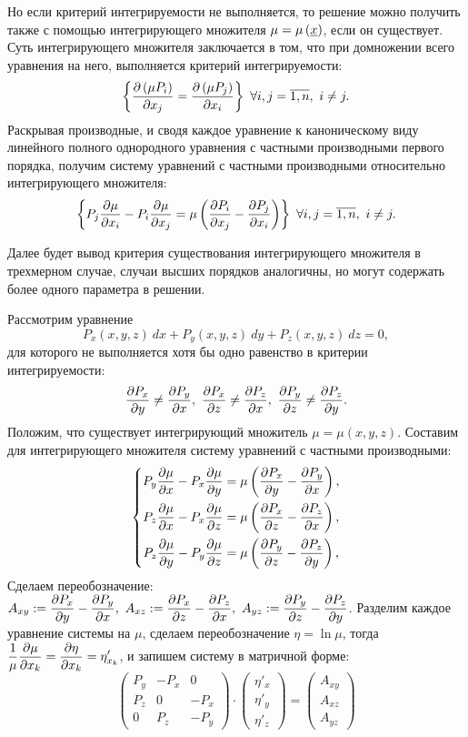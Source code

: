 	\vspace{10pt}
	Но если критерий интегрируемости не выполняется, то решение можно получить также с помощью интегрирующего множителя $\mu = \mu\left( \underline{x} \right)$, если он существует. Суть интегрирующего множителя заключается в том, что при домножении всего уравнения на него, выполняется критерий интегрируемости:
	\[ \left\lbrace  \dfrac{\partial \left( \mu P_i \right)}{\partial x_j} = \dfrac{\partial \left( \mu P_j \right)}{\partial x_i}  \right\rbrace ~ \forall i, j = \overline{1, n}, ~ i \neq j. \]
	Раскрывая производные, и сводя каждое уравнение к каноническому виду линейного полного однородного уравнения с частными производными первого порядка, получим систему уравнений с частными производными относительно интегрирующего множителя:
	\[ \left\lbrace  P_j \dfrac{\partial \mu}{\partial x_i} - P_i \dfrac{\partial \mu}{\partial x_j} = \mu \left( \dfrac{\partial P_i}{\partial x_j} - \dfrac{\partial P_j}{\partial x_i} \right)  \right\rbrace ~ \forall i, j = \overline{1, n}, ~ i \neq j. \]

	\vspace{10pt}
	Далее будет вывод критерия существования интегрирующего множителя в трехмерном случае, случаи высших порядков аналогичны, но могут содержать более одного параметра в решении.

	Рассмотрим уравнение
	\[ P_x (x, y, z) ~ dx + P_y (x, y, z) ~ dy + P_z (x, y, z) ~ dz = 0, \]
	для которого не выполняется хотя бы одно равенство в критерии интегрируемости:
	\[ \dfrac{\partial P_x}{\partial y} \neq \dfrac{\partial P_y}{\partial x}, ~ \dfrac{\partial P_x}{\partial z} \neq \dfrac{\partial P_z}{\partial x}, ~ \dfrac{\partial P_y}{\partial z} \neq \dfrac{\partial P_z}{\partial y}. \]
	Положим, что существует интегрирующий множитель $\mu = \mu(x, y, z)$. Составим для интегрирующего множителя систему уравнений с частными производными:
	\[ \left\lbrace \begin{split}
		P_y \dfrac{\partial \mu}{\partial x} - P_x \dfrac{\partial \mu}{\partial y} &= \mu \left( \dfrac{\partial P_x}{\partial y} - \dfrac{\partial P_y}{\partial x} \right), \\ 
		P_z \dfrac{\partial \mu}{\partial x} - P_x \dfrac{\partial \mu}{\partial z} &= \mu \left( \dfrac{\partial P_x}{\partial z} - \dfrac{\partial P_z}{\partial x} \right), \\ 
		P_z \dfrac{\partial \mu}{\partial y} - P_y \dfrac{\partial \mu}{\partial z} &= \mu \left( \dfrac{\partial P_y}{\partial z} - \dfrac{\partial P_z}{\partial y} \right), \\ 
	\end{split} \right. \]
	Сделаем переобозначение: \( \displaystyle A_{xy} := \dfrac{\partial P_x}{\partial y} - \dfrac{\partial P_y}{\partial x}, ~ A_{xz} := \dfrac{\partial P_x}{\partial z} - \dfrac{\partial P_z}{\partial x}, ~ A_{yz} := \dfrac{\partial P_y}{\partial z} - \dfrac{\partial P_z}{\partial y} \). Разделим каждое уравнение системы на $\mu$, сделаем переобозначение $\eta = \ln{\mu}$, тогда \( \displaystyle \frac{1}{\mu} \dfrac{\partial \mu}{\partial x_k} = \dfrac{\partial \eta}{\partial x_k} = \eta'_{x_k} \), и запишем систему в матричной форме:
	\[ \begin{pmatrix}
		P_y & - P_x & 0 \\
		P_z & 0 & - P_x \\
		0 & P_z & - P_y
	\end{pmatrix} \cdot \begin{pmatrix}
		\eta'_x \\ \eta'_y \\ \eta'_z
	\end{pmatrix} = \begin{pmatrix}
		A_{xy} \\ A_{xz} \\ A_{yz}
	\end{pmatrix} \]

